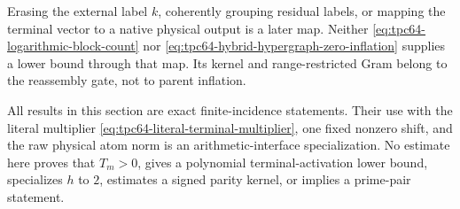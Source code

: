Erasing the external label \(k\), coherently grouping residual labels, or
mapping the terminal vector to a native physical output is a later map.
Neither \eqref{eq:tpc64-logarithmic-block-count} nor
\eqref{eq:tpc64-hybrid-hypergraph-zero-inflation} supplies a lower bound through
that map.  Its kernel and range-restricted Gram belong to the reassembly
gate, not to parent inflation.

\begin{remark}
\label{rem:tpc64-hybrid-claim-boundary}
All results in this section are exact finite-incidence statements.  Their
use with the literal multiplier
\eqref{eq:tpc64-literal-terminal-multiplier}, one fixed nonzero shift,
and the raw physical atom norm is an arithmetic-interface
specialization.  No estimate here proves that
\(T_m>0\), gives a polynomial terminal-activation lower bound,
specializes \(h\) to \(2\), estimates a signed parity kernel, or implies a
prime-pair statement.
\end{remark}
